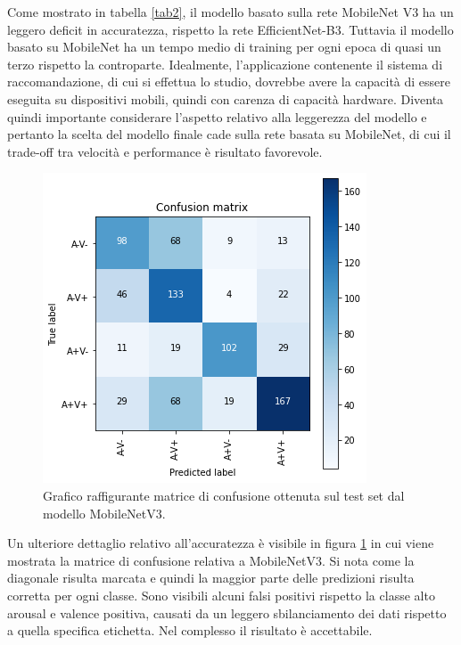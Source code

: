 \documentclass[11pt]{report}
\begin{document}
\newpage

Come mostrato in tabella \ref{tab2}, il modello basato sulla rete MobileNet V3 ha un leggero deficit in accuratezza, rispetto la rete EfficientNet-B3. Tuttavia il modello basato su MobileNet ha un tempo medio di training per ogni epoca di quasi un terzo rispetto la controparte. Idealmente, l'applicazione contenente il sistema di raccomandazione, di cui si effettua lo studio, dovrebbe avere la capacità di essere eseguita su dispositivi mobili, quindi con carenza di capacità hardware. Diventa quindi importante considerare l'aspetto relativo alla leggerezza del modello e pertanto la scelta del modello finale cade sulla rete basata su MobileNet, di cui il trade-off tra velocità e performance è risultato favorevole. 



\begin{figure}[h]
    \centering
    \includegraphics[scale=0.65]{img/CM-MobileNet.png}
    \caption{Grafico raffigurante matrice di confusione ottenuta sul test set dal modello MobileNetV3.}
    \label{fig:cnn-cm}
\end{figure}


Un ulteriore dettaglio relativo all'accuratezza è visibile in figura \ref{fig:cnn-cm} in cui viene mostrata la matrice di confusione relativa a MobileNetV3. Si nota come la diagonale risulta marcata e quindi la maggior parte delle predizioni risulta corretta per ogni classe. Sono visibili alcuni falsi positivi rispetto la classe alto arousal e valence positiva, causati da un leggero sbilanciamento dei dati rispetto a quella specifica etichetta. Nel complesso il risultato è accettabile.
\end{document}
